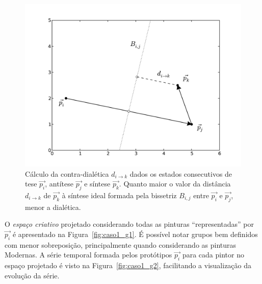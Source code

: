 \begin{figure}[ht!]
\begin{center}
        \includegraphics[scale=.6]{figs/desc_dialetica.pdf}
      \caption{Cálculo da contra-dialética $d_{i \rightarrow k}$ dados os
        estados consecutivos de tese $\vec{p_i}$, antítese $\vec{p_j}$ e síntese
        $\vec{p_k}$. Quanto maior o valor da distância $d_{i \rightarrow k}$ de
        $\vec{p_k}$ à síntese ideal formada pela bissetriz $B_{i,j}$ entre
        $\vec{p_i}$ e $\vec{p_j}$, menor a dialética.  }
        \label{fig:desc_dialetica}
\end{center}
\end{figure}


O \textit{espaço criativo} projetado considerando todas as pinturas
``representadas'' por $\vec{p_i}$ é apresentado na Figura~\ref{fig:caso1_g1}. É
possível notar grupos bem definidos com menor sobreposição, principalmente
quando considerando as pinturas Modernas. A série temporal formada pelos
protótipos $\vec{p_i}$ para cada pintor no espaço projetado é visto na
Figura~\ref{fig:caso1_g2}, facilitando a visualização da evolução da série.

